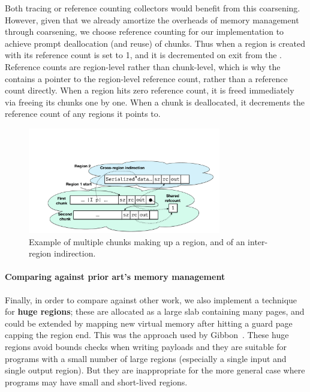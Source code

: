 Both tracing or reference counting collectors would benefit from this
coarsening.  However, given that we already amortize the overheads of memory
management through coarsening, we choose reference counting for our
implementation to achieve prompt deallocation (and reuse) of chunks.
%
Thus when a region is created with  its reference count is set to 1,
and it is decremented on exit from the .
%
Reference counts are region-level rather than chunk-level, which is why the
 contains a pointer to the region-level reference count, rather than
a reference count directly.
%
When a region hits zero reference count, it is freed immediately via freeing its
chunks one by one.  When a chunk is deallocated, it decrements the reference
count of any regions it points to.


\begin{figure}
  \vspace{-15mm}
  \begin{center}
    \includegraphics[width=0.75\textwidth]{region-memlayout2}
  \end{center}
  \vspace{-4mm}
  \caption{Example of multiple chunks making up a region, and of an inter-region
    indirection.  \captionscrunch{}}
  \label{fig:regions}
\end{figure}


\paragraph{Comparing against prior art's memory management}
Finally, in order to compare against other work, we also implement a technique
for {\bf huge regions}; these are allocated as a large slab containing many
pages, and could be extended by mapping new virtual memory after hitting a guard
page capping the region end.  This was the approach used by
Gibbon~\cite{ecoop17-gibbon}.
%
These huge regions avoid bounds checks when writing payloads and they are
suitable for programs with a small number of large regions (especially a single
input and single output region).  But they are inappropriate for the more
general case where programs may have small and short-lived regions.
%

